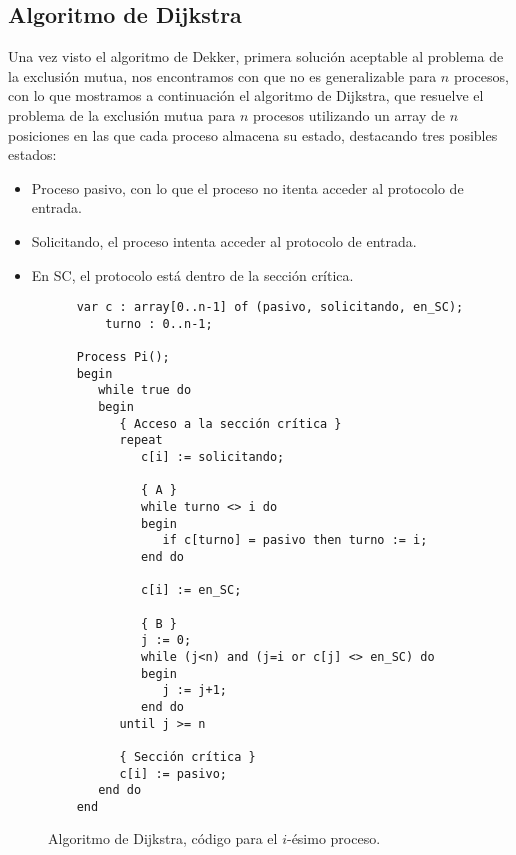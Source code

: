\subsection{Algoritmo de Dijkstra}
Una vez visto el algoritmo de Dekker, primera solución aceptable al problema de la exclusión mutua, nos encontramos con que no es generalizable para $n$ procesos, con lo que mostramos a continuación el algoritmo de Dijkstra, que resuelve el problema de la exclusión mutua para $n$ procesos utilizando un array de $n$ posiciones en las que cada proceso almacena su estado, destacando tres posibles estados:
\begin{itemize}
    \item Proceso pasivo, con lo que el proceso no itenta acceder al protocolo de entrada.
    \item Solicitando, el proceso intenta acceder al protocolo de entrada.
    \item En SC, el protocolo está dentro de la sección crítica.
\end{itemize}
\begin{figure}[H]
\begin{verbatim}
    var c : array[0..n-1] of (pasivo, solicitando, en_SC);
        turno : 0..n-1;

    Process Pi();
    begin
       while true do
       begin
          { Acceso a la sección crítica }
          repeat
             c[i] := solicitando;

             { A }
             while turno <> i do
             begin
                if c[turno] = pasivo then turno := i;
             end do

             c[i] := en_SC;

             { B }
             j := 0;
             while (j<n) and (j=i or c[j] <> en_SC) do
             begin
                j := j+1;
             end do
          until j >= n

          { Sección crítica }
          c[i] := pasivo;
       end do
    end
\end{verbatim}
\caption{Algoritmo de Dijkstra, código para el $i$-ésimo proceso.}
\end{figure}

